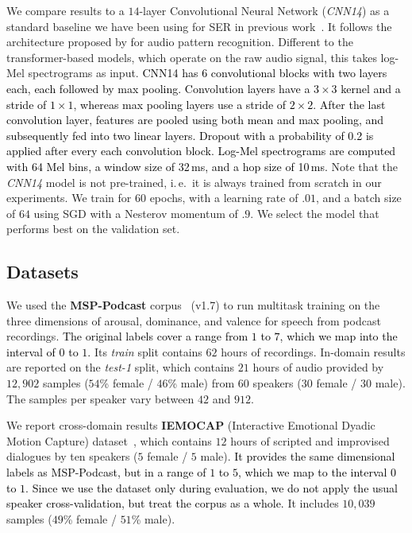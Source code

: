 \documentclass{article}
\newcommand\cnn{\mbox{\emph{CNN14}}}
\newcommand{\review}[1]{\textcolor{black}{#1}}
\newcommand\msppodcast{\mbox{MSP-Podcast}}
\newcommand\iemocap{\mbox{IEMOCAP}}
\newcommand{\ie}{i.\,e.\ }
\begin{document}
We compare results to a $14$-layer Convolutional Neural Network ({\cnn}) as a standard baseline
we have been using for \ac{SER} in previous work~\citep{triantafyllopoulos2021role, triantafyllopoulos2021multistage}. 
It follows the architecture proposed by \citet{kong2019panns} for audio pattern recognition. 
Different to the transformer-based models,
which operate on the raw audio signal,
this takes log-Mel spectrograms as input. 
\review{
CNN14 has $6$ convolutional blocks with two layers each, each followed by max pooling.
Convolution layers have a $3\times3$ kernel and a stride of $1\times1$, whereas max pooling layers use a stride of $2\times2$.
After the last convolution layer, features are pooled using both mean and max pooling, and subsequently fed into two linear layers.
Dropout with a probability of 0.2 is applied after every each convolution block.
Log-Mel spectrograms are computed with 64 Mel bins, a window size of 32\,ms, and a hop size of 10\,ms.
}
Note that the {\cnn} model is not pre-trained,
\ie it is always trained from scratch in our experiments.
We train for $60$ epochs,
with a learning rate of $.01$,
and a batch size of $64$
using \ac{SGD} with a Nesterov momentum of $.9$.
We select the model that performs best on the validation set.




\subsection{Datasets}
\label{subsec:datasets}



We used the \textbf{\msppodcast} corpus~\citep{lotfian2019msppodcast} (v1.7)
to run multitask training on the three dimensions of arousal, dominance, and valence
for speech from podcast recordings.
\review{The original labels cover a range from $1$ to $7$, 
which we map into the interval of $0$ to $1$.}
Its \emph{train} split contains $62$ hours of recordings. 
In-domain results are reported on the \emph{test-1} split,
which contains $21$ hours of audio
provided by $12,902$ samples ($54$\% female / $46$\% male)
from $60$ speakers ($30$ female / $30$ male). 
The samples per speaker 
vary between $42$ and $912$. 

We report cross-domain results \textbf{\iemocap} (Interactive Emotional Dyadic Motion Capture) dataset~\cite{busso2008iemocap},
which contains $12$ hours of scripted and improvised dialogues by ten speakers ($5$ female / $5$ male).
\review{It provides the same dimensional labels as {\msppodcast},
but in a range of $1$ to $5$, 
which we map to the interval $0$ to $1$.
Since we use the dataset only during evaluation, 
we do not apply the usual speaker cross-validation, but treat the corpus as a whole.}
It includes $10,039$ samples ($49$\% female / $51$\% male). 
\end{document}
